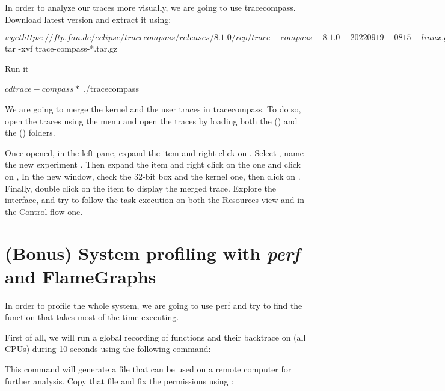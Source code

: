 In order to analyze our traces more visually, we are going to use tracecompass.
Download  latest version and extract it using:

\begin{bashinput}
$ wget https://ftp.fau.de/eclipse/tracecompass/releases/8.1.0/rcp/trace-compass-8.1.0-20220919-0815-linux.gtk.x86_64.tar.gz
$ tar -xvf trace-compass-*.tar.gz
\end{bashinput}

Run it
\begin{bashinput}
$ cd trace-compass*
$ ./tracecompass
\end{bashinput}

We are going to merge the kernel and the user traces in tracecompass. To do so,
open the traces using the  menu and open the traces
by loading both the  () and the 
() folders.

Once opened, in the left pane, expand the  item and right click
on . Select , name the new experiment
. Then expand the  item and right click on
the  one and click on , In the new
window, check the 32-bit box and the kernel one, then click on .
Finally, double click on the  item to display the merged
trace. Explore the interface, and try to follow the task execution on both the
Resources view and in the Control flow one.

\section{(Bonus) System profiling with {\em perf} and FlameGraphs}

In order to profile the whole system, we are going to use perf and try to find
the function that takes most of the time executing.

First of all, we will run a global recording of functions and their backtrace on
(all CPUs) during 10 seconds using the following command:


This command will generate a  file that can be used on a remote
computer for further analysis. Copy that file and fix the permissions using
:


